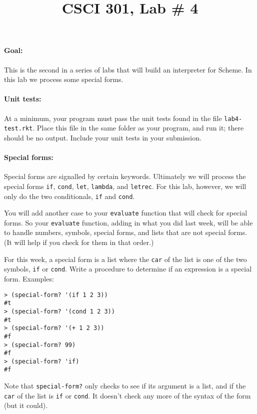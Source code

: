 \documentclass[letterpaper,12pt]{article}
\title{CSCI 301, Lab \# 4}
\author{\term}
\begin{document}
\maketitle
\setlength{\columnsep}{2em}
\begin{multicols}{2}


\paragraph{Goal:} This is the second in a series of labs that will
build an interpreter for Scheme.  In this lab we process some special forms. 

\paragraph{Unit tests:}
At a minimum, your program must pass the unit tests found in the
file {\tt lab4-test.rkt}.  Place this file in the same folder
as your program, and run it;  there should be no output.  Include
your unit tests in your submission.

\paragraph{Special forms:}
Special forms are signalled by certain keywords.  Ultimately we
will process the special forms {\tt if}, {\tt cond}, {\tt let},
{\tt lambda}, and {\tt letrec}.  For this lab, however, we will only
do the two conditionals, {\tt if} and {\tt cond}.

You will add another case to your {\tt evaluate} function that will
check for special forms. So your {\tt evaluate} function, adding in
what you did last week, will be able to handle numbers, symbols,
special forms, and lists that are not special forms.  (It will help if
you check for them in that order.)

For this week, a special form is a list
where the {\tt car} of the list is one of the two symbols, {\tt if} or
{\tt cond}.  
Write a procedure to determine if an expression is a special form.
Examples:
\begin{Verbatim}
> (special-form? '(if 1 2 3))
#t
> (special-form? '(cond 1 2 3))
#t
> (special-form? '(+ 1 2 3))
#f
> (special-form? 99)
#f
> (special-form? 'if)
#f
\end{Verbatim}
Note that {\tt special-form?} only checks to see if its argument is a
list, and if the {\tt car} of the list is {\tt if} or {\tt cond}.  It
doesn't check any more of the syntax of the form (but it could).


\end{multicols}
\end{document}
